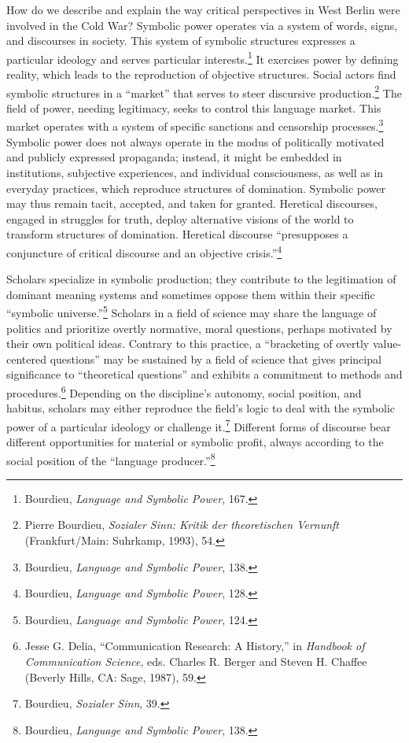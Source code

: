 \documentclass{tufte-handout}
\begin{document}
How do we describe and explain the way critical perspectives in West
Berlin were involved in the Cold War? Symbolic power operates via a
system of words, signs, and discourses in society. This system of
symbolic structures expresses a particular ideology and serves
particular interests.\footnote{Bourdieu, \emph{Language and Symbolic
  Power}, 167.} It exercises power by defining reality, which leads to
the reproduction of objective structures. Social actors find symbolic
structures in a ``market'' that serves to steer discursive
production.\footnote{Pierre Bourdieu, \emph{Sozialer Sinn: Kritik der
  theoretischen Vernunft} (Frankfurt/Main: Suhrkamp, 1993), 54.} The
field of power, needing legitimacy, seeks to control this language
market. This market operates with a system of specific sanctions and
censorship processes.\footnote{Bourdieu, \emph{Language and Symbolic
  Power}, 138.} Symbolic power does not always operate in the modus of
politically motivated and publicly expressed propaganda; instead, it
might be embedded in institutions, subjective experiences, and
individual consciousness, as well as in everyday practices, which
reproduce structures of domination. Symbolic power may thus remain
tacit, accepted, and taken for granted. Heretical discourses, engaged in
struggles for truth, deploy alternative visions of the world to
transform structures of domination. Heretical discourse ``presupposes a
conjuncture of critical discourse and an objective crisis.''\footnote{Bourdieu,
  \emph{Language and Symbolic Power}, 128.}

Scholars specialize in symbolic production; they contribute to the
legitimation of dominant meaning systems and sometimes oppose them
within their specific ``symbolic universe.''\footnote{Bourdieu,
  \emph{Language and Symbolic Power}, 124.} Scholars in a field of
science may share the language of politics and prioritize overtly
normative, moral questions, perhaps motivated by their own political
ideas. Contrary to this practice, a ``bracketing of overtly
value-centered questions'' may be sustained by a field of science that
gives principal significance to ``theoretical questions'' and exhibits a
commitment to methods and procedures.\footnote{Jesse G. Delia,
  ``Communication Research: A History,'' in \emph{Handbook of
  Communication Science}, eds. Charles R. Berger and Steven H. Chaffee
  (Beverly Hills, CA: Sage, 1987), 59.} Depending on the discipline's
autonomy, social position, and habitus, scholars may either reproduce
the field's logic to deal with the symbolic power of a particular
ideology or challenge it.\footnote{Bourdieu, \emph{Sozialer Sinn}, 39.}
Different forms of discourse bear different opportunities for material
or symbolic profit, always according to the social position of the
``language producer.''\footnote{Bourdieu, \emph{Language and Symbolic
  Power}, 138.}
\end{document}
